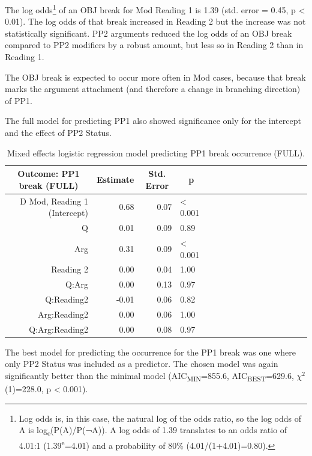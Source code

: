 \documentclass[12pt,oneside]{book}
\let\rmarkdownfootnote\footnote%
\def\footnote{\protect\rmarkdownfootnote}
\begin{document}
The log odds\footnote{Log odds is, in this case, the natural log of the odds ratio, so the log odds of A is log\textsubscript{e}(P(A)/P(¬A)). A log odds of 1.39 translates to an odds ratio of 4.01:1 (1.39\textsuperscript{e}=4.01) and a probability of 80\% (4.01/(1+4.01)=0.80).} of an OBJ break for Mod Reading 1 is 1.39 (std. error = 0.45, p \textless{} 0.01). The log odds of that break increased in Reading 2 but the increase was not statistically significant. PP2 arguments reduced the log odds of an OBJ break compared to PP2 modifiers by a robust amount, but less so in Reading 2 than in Reading 1.

The OBJ break is expected to occur more often in Mod cases, because that break marks the argument attachment (and therefore a change in branching direction) of PP1.

The full model for predicting PP1 also showed significance only for the intercept and the effect of PP2 Status.

\begin{table}[!h]

\caption{\label{tab:fullpp1Mod}Mixed effects logistic regression model predicting PP1 break occurrence (FULL).}
\centering
\begin{tabular}{rrrlrrrlrrrlrrrl}
\toprule
\multicolumn{1}{c}{Outcome: PP1 break (FULL)} & \multicolumn{1}{c}{Estimate} & \multicolumn{1}{c}{Std. Error} & \multicolumn{1}{c}{p}\\
\midrule
D Mod, Reading 1 (Intercept) & 0.68 & 0.07 & < 0.001\\
Q & 0.01 & 0.09 & 0.89\\
Arg & 0.31 & 0.09 & < 0.001\\
Reading 2 & 0.00 & 0.04 & 1.00\\
Q:Arg & 0.00 & 0.13 & 0.97\\
\addlinespace
Q:Reading2 & -0.01 & 0.06 & 0.82\\
Arg:Reading2 & 0.00 & 0.06 & 1.00\\
Q:Arg:Reading2 & 0.00 & 0.08 & 0.97\\
\bottomrule
\end{tabular}
\end{table}

The best model for predicting the occurrence for the PP1 break was one where only PP2 Status was included as a predictor. The chosen model was again significantly better than the minimal model (AIC\textsubscript{MIN}=855.6, AIC\textsubscript{BEST}=629.6, \(\chi^2\)(1)=228.0, p \textless{} 0.001).
\end{document}
